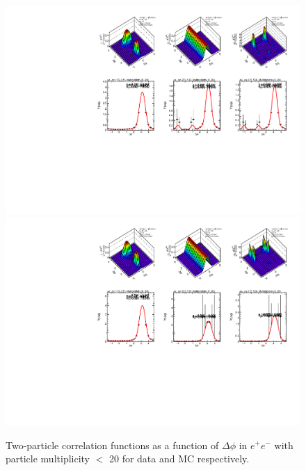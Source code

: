 \begin{figure}[!htb]
\begin{center}
\includegraphics[width=.45\textwidth]{images/BeamAxis/0_20_2/beam/LEP1Data1992_thrust0_mix0_wta0_perp0_gen0_ajrej0_ajrejcut0p0_threejet0_threejetcut0p0_owbarrel0_anatyperegion0_etabarrelcut0p0_typeEnergyBarrelSel0_etabarrelcutforEselection0p0_maxrelenergyinsidebarrel1p0_typemultiplicity0_ASummary_0_0_20_2_0.pdf}
\includegraphics[width=.45\textwidth]{images/BeamAxis/0_20_2/beam/LEP1MC1994_20180323_thrust0_mix0_wta0_perp0_gen0_ajrej0_ajrejcut0p0_threejet0_threejetcut0p0_owbarrel0_anatyperegion0_etabarrelcut0p0_typeEnergyBarrelSel0_etabarrelcutforEselection0p0_maxrelenergyinsidebarrel1p0_typemultiplicity0_ASummary_0_0_20_2_0.pdf}
\caption{Two-particle correlation functions as a function of  $\Delta\phi$ in $e^{+}e^{-}$ with particle multiplicity $<$ 20 for data and MC respectively.}
\label{fig:ProjectionMultLess20} 
\end{center}
\end{figure}


